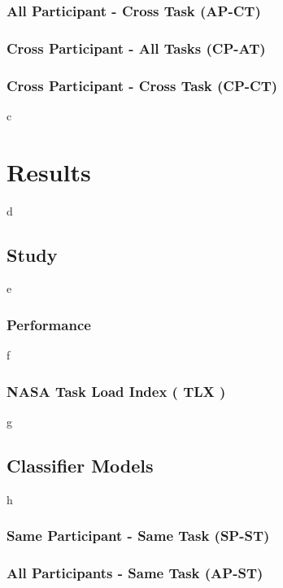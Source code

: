 \documentclass[11pt]{article}
\begin{document}
		\subsubsection{All Participant - Cross Task (AP-CT)}
		\subsubsection{Cross Participant - All Tasks (CP-AT)}
		\subsubsection{Cross Participant - Cross Task (CP-CT)}
c
\section{Results}
d
	\subsection{Study}
e		
		\subsubsection{Performance}
f		
		\subsubsection{NASA Task Load Index ( TLX )}
g		
	\subsection{Classifier Models}
h	
		\subsubsection{Same Participant - Same Task (SP-ST)}
		
		\subsubsection{All Participants - Same Task (AP-ST)}
		
\end{document}
